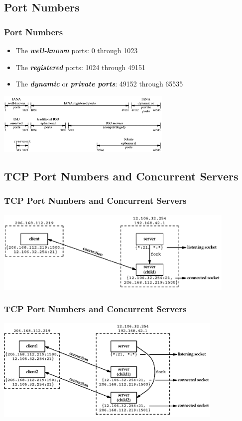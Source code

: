 \documentclass[notes,serif]{beamer}
\begin{document}
\subsection{Port Numbers}
\begin{frame}
  \frametitle{Port Numbers}
    \begin{itemize}
      \item The {\bf \em well-known} ports: 0 through 1023
      \item The {\bf \em registered} ports: 1024 through 49151
      \item The {\bf \em dynamic} or {\bf \em private ports}: 49152 through 65535
    \end{itemize}
    \hspace{2em} \includegraphics[height=3cm]{figs/02fig10.png}
\end{frame}

\subsection{TCP Port Numbers and Concurrent Servers}
\begin{frame}
  \frametitle{TCP Port Numbers and Concurrent Servers}
  \begin{center}
  \includegraphics[height=4cm]{figs/02fig13.png}
  \end{center}
\end{frame}

\begin{frame}
  \frametitle{TCP Port Numbers and Concurrent Servers}
  \begin{center}
  \includegraphics[height=5cm]{figs/02fig14.png}
  \end{center}
\end{frame}
\end{document}
